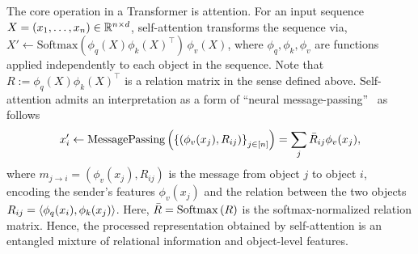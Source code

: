 The core operation in a Transformer is attention. For an input sequence $X = (x_1, \ldots, x_n) \in \mathbb{R}^{n \times d}$, self-attention transforms the sequence via, $ X' \gets \mathrm{Softmax}({\phi_q(X)} {\phi_k(X)}^\top) \, \phi_v(X)$, where $\phi_q, \phi_k, \phi_v$ are functions applied independently to each object in the sequence.
Note that $R := {\phi_q(X)} {\phi_k(X)}^\top$ is a relation matrix in the sense defined above. Self-attention admits an interpretation as a form of ``neural message-passing''~\citep{gilmer2017neural} as follows
\begin{equation}\label{eq:self_attn_message_passing}
    x_i' \gets \mathrm{MessagePassing}\left(\left\{(\phi_v(x_j), R_{ij})\right\}_{j \in [n]}\right) = \sum_{j} \bar{R}_{ij} \phi_v(x_j),
\end{equation}
where $m_{j \to i} = (\phi_v(x_j), R_{ij})$ is the message from object $j$ to object $i$, encoding the sender's features $\phi_v(x_j)$ and the relation between the two objects $R_{ij} = \left \langle \phi_q(x_i), \phi_k(x_j) \right\rangle$. Here, $\bar{R} = \mathrm{Softmax}\left(R\right)$ is the softmax-normalized relation matrix. Hence, the processed representation obtained by self-attention is an entangled mixture of relational information and object-level features.


